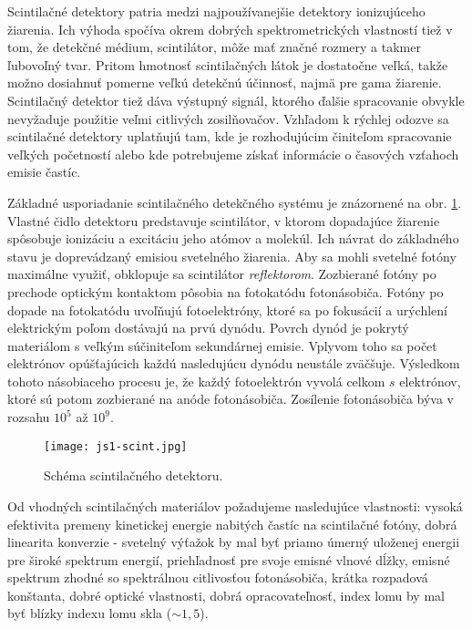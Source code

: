 \documentclass[../../main.tex]{subfiles}
\begin{document}
Scintilačné detektory patria medzi najpoužívanejšie detektory ionizujúceho žiarenia. Ich výhoda spočíva okrem dobrých spektrometrických vlastností tiež v tom, že detekčné médium, scintilátor, môže mať značné rozmery a takmer ľubovoľný tvar. Pritom hmotnosť scintilačných látok je dostatočne veľká, takže možno dosiahnuť pomerne veľkú detekčnú účinnosť, najmä pre gama žiarenie. Scintilačný detektor tiež dáva výstupný signál, ktorého ďalšie spracovanie obvykle nevyžaduje použitie veľmi citlivých zosilňovačov. Vzhľadom k rýchlej odozve sa scintilačné detektory uplatňujú tam, kde je rozhodujúcim činiteľom spracovanie veľkých početností alebo kde potrebujeme získať informácie o časových vzťahoch emisie častíc.

Základné usporiadanie scintilačného detekčného systému je znázornené na obr. \ref{em4:img:schemascint}. Vlastné čidlo detektoru predstavuje scintilátor, v ktorom dopadajúce žiarenie spôsobuje ionizáciu a excitáciu jeho atómov a molekúl. Ich návrat do základného stavu je doprevádzaný emisiou svetelného žiarenia. Aby sa mohli svetelné fotóny maximálne využiť, obklopuje sa scintilátor \textit{reflektorom}. Zozbierané fotóny po prechode optickým kontaktom pôsobia na fotokatódu fotonásobiča. Fotóny po dopade na fotokatódu uvoľňujú fotoelektróny, ktoré sa po fokusácií a urýchlení elektrickým poľom dostávajú na prvú dynódu. Povrch dynód je pokrytý materiálom s veľkým súčiniteľom sekundárnej emisie. Vplyvom toho sa počet elektrónov opúšťajúcich každú nasledujúcu dynódu neustále zväčšuje. Výsledkom tohoto násobiaceho procesu je, že každý fotoelektrón vyvolá celkom $s$ elektrónov, ktoré sú potom zozbierané na anóde fotonásobiča. Zosílenie fotonásobiča býva v rozsahu $10^5$ až $10^9$.

\begin{figure}[h]
\centering
\texttt{[image: js1-scint.jpg]}
\caption{Schéma scintilačného detektoru.}
\label{em4:img:schemascint}
\end{figure}

Od vhodných scintilačných materiálov požadujeme nasledujúce vlastnosti: vysoká efektivita premeny kinetickej energie nabitých častíc na scintilačné fotóny, dobrá linearita konverzie - svetelný výťažok by mal byť priamo úmerný uloženej energii pre široké spektrum energií, priehľadnosť pre svoje emisné vlnové dĺžky, emisné spektrum zhodné so spektrálnou citlivosťou fotonásobiča, krátka rozpadová konštanta, dobré optické vlastnosti, dobrá opracovateľnosť, index lomu by mal byť blízky indexu lomu skla ($\sim 1,5$).
\end{document}
